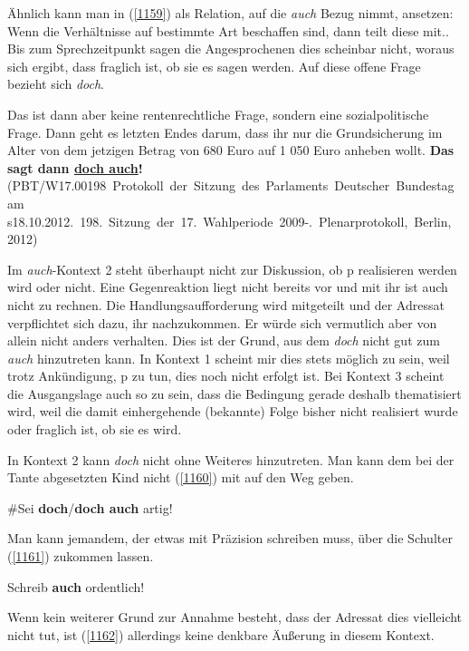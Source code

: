 {Ähnlich kann man in (\ref{1159}) als Relation, auf die \textit{auch} Bezug nimmt, ansetzen: \glq Wenn die Verhältnisse auf bestimmte Art beschaffen sind, dann teilt diese mit.\grq {}. Bis zum Sprechzeitpunkt sagen die Angesprochenen dies scheinbar nicht, woraus sich ergibt, dass fraglich ist, ob sie es sagen werden. Auf diese offene Frage bezieht sich \textit{doch}.
	
\begin{exe}
	\ex\label{1159} 
	\scriptsize
	Das ist dann aber keine rentenrechtliche Frage, sondern eine sozialpolitische Frage. Dann geht es letzten Endes darum, dass ihr nur die Grundsicherung 		im Alter von dem jetzigen Betrag von 680 Euro auf 1 050 Euro anheben wollt. \textbf{Das sagt dann \underline{doch auch}! }
	\newline
	\hbox{}\hfill\hbox{(PBT/W17.00198 Protokoll der Sitzung des Parlaments Deutscher Bundestag am}
	\newline
	\hbox{}\hfill\hbox{s18.10.2012. 198. Sitzung der 17. Wahlperiode 2009-. Plenarprotokoll, Berlin, 2012)}
\end{exe}	
Im \textit{auch}-Kontext 2 steht überhaupt nicht zur Diskussion, ob p realisieren werden wird oder nicht. Eine Gegenreaktion liegt nicht bereits vor und mit ihr ist auch nicht zu rechnen. Die Handlungsaufforderung wird mitgeteilt und der Adressat verpflichtet sich dazu, ihr nachzukommen. Er würde sich vermutlich aber von allein nicht anders verhalten. Dies ist der Grund, aus dem \textit{doch} nicht gut zum \textit{auch} hinzutreten kann. In Kontext 1 scheint mir dies stets möglich zu sein, weil trotz Ankündigung, p zu tun, dies noch nicht erfolgt ist. Bei Kontext 3 scheint die Ausgangslage auch so zu sein, dass die Bedingung gerade deshalb thematisiert wird, weil die damit einhergehende (bekannte) Folge bisher nicht realisiert wurde oder fraglich ist, ob sie es wird.

In Kontext 2 kann \textit{doch} nicht ohne Weiteres hinzutreten. Man kann dem bei der Tante abgesetzten Kind nicht (\ref{1160}) mit auf den Weg geben.

\begin{exe}
	\ex\label{1160} 
	\#Sei \textbf{doch}/\textbf{doch auch} artig!
\end{exe}	
Man kann jemandem, der etwas mit Präzision schreiben muss, über die Schulter (\ref{1161}) zukommen lassen.

\begin{exe}
	\ex\label{1161} 
	Schreib \textbf{auch} ordentlich!
\end{exe}	
Wenn kein weiterer Grund zur Annahme besteht, dass der Adressat dies viel\-leicht nicht tut, ist (\ref{1162}) allerdings keine denkbare Äußerung in diesem Kontext.

}
